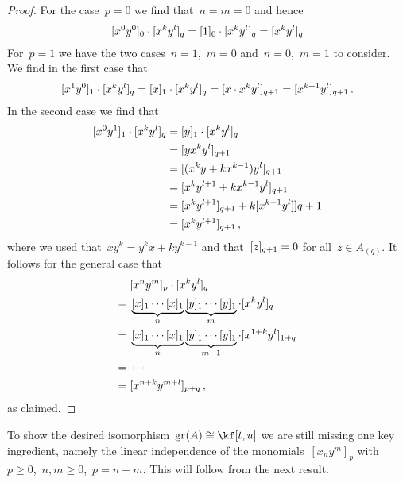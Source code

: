 \begin{proof}
  For the case~$p = 0$ we find that~$n = m = 0$ and hence
  \[
    \lbrack x^0 y^0 \rbrack_0 \cdot \lbrack x^k y^l \rbrack_q
    =
    \lbrack 1 \rbrack_0 \cdot \lbrack x^k y^l \rbrack_q
    =
    \lbrack x^k y^l \rbrack_q
  \]
  For~$p = 1$ we have the two cases~$n = 1$,~$m = 0$ and~$n = 0$,~$m = 1$ to consider.
  We find in the first case that
  \[
    \lbrack x^1 y^0 \rbrack_1 \cdot \lbrack x^k y^l\rbrack_q
    =
    \lbrack x\rbrack_1 \cdot \lbrack x^k y^l \rbrack_q
    =
    \lbrack x \cdot x^k y^l\rbrack_{q+1}
    =
    \lbrack x^{k+1} y^l \rbrack_{q+1} \,.
  \]
  In the second case we find that
  \begin{align*}
    \lbrack x^0 y^1 \rbrack_1 \cdot \lbrack x^k y^l \rbrack_q
    &=
    \lbrack y\rbrack_1 \cdot \lbrack x^k y^l \rbrack_q
    \\
    &=
    \lbrack y x^k y^l \rbrack_{q+1}
    \\
    &=
    \lbrack (x^k y + k x^{k-1}) y^l \rbrack_{q+1}
    \\
    &=
    \lbrack x^k y^{l+1} + k x^{k-1} y^l \rbrack_{q+1}
    \\
    &=
    \lbrack x^k y^{l+1} \rbrack_{q+1} + k \lbrack x^{k-1} y^l] \rbrack{q+1}
    \\
    &=
    \lbrack x^k y^{l+1} \rbrack_{q+1} \,,
  \end{align*}
  where we used that~$x y^k = y^k x + k y^{k-1}$ and that~$\lbrack z \rbrack_{q+1} = 0$ for all~$z \in A_{(q)}$.
  It follows for the general case that
  \begin{align*}
    {}&
    \lbrack x^n y^m \rbrack_p \cdot \lbrack x^k y^l \rbrack_q
    \\
    ={}&
    \underbrace{ \lbrack x\rbrack_1 \dotsm \lbrack x\rbrack_1 }_{n}
    \underbrace{ \lbrack y\rbrack_1 \dotsm \lbrack y\rbrack_1 }_{m}
    \cdot
    \lbrack x^k y^l \rbrack_q
    \\
    ={}&
    \underbrace{ \lbrack x\rbrack_1 \dotsm \lbrack x\rbrack_1 }_{n}
    \underbrace{ \lbrack y\rbrack_1 \dotsm \lbrack y\rbrack_1 }_{m-1}
    \cdot
    \lbrack x^{1+k}  y^l \rbrack_{1+q}
    \\
    ={}&
    \dotsb
    \\
    ={}&
    \lbrack x^{n+k} y^{m+l} \rbrack_{p+q} \,,
  \end{align*}
  as claimed.
\end{proof}


\begin{fluff}
  To show the desired isomorphism~$\gr(A) \cong \kf[t,u]$ we are still missing one key ingredient, namely the linear independence of the monomials~$[x_n y^m]_p$ with~$p \geq 0$,~$n, m \geq 0$,~$p = n+m$.
  This will follow from the next result.
\end{fluff}


